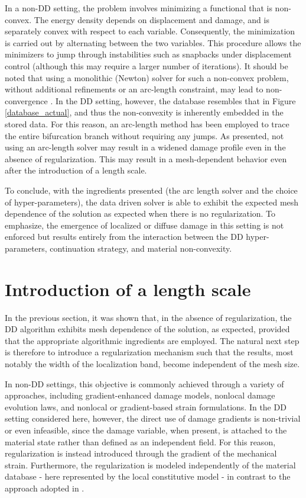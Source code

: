 \documentclass[10pt]{cas-sc}
\begin{document}
In a non-DD setting, the problem involves minimizing a functional that is non-convex. The energy density depends on displacement and damage, and is separately convex with respect to each variable. Consequently, the minimization is carried out by alternating between the two variables. This procedure allows the minimizers to jump through instabilities such as snapbacks under displacement control (although this may require a larger number of iterations). It should be noted that using a monolithic (Newton) solver for such a non-convex problem, without additional refinements or an arc-length constraint, may lead to non-convergence \cite{Farrell2017, Gerasimov2016, Singh2016, Bharali2022}. In the DD setting, however, the database resembles that in Figure \ref{database_actual}, and thus the non-convexity is inherently embedded in the stored data. For this reason, an arc-length method has been employed to trace the entire bifurcation branch without requiring any jumps. As presented, not using an arc-length solver may result in a widened damage profile even in the absence of regularization. This may result in a mesh-dependent behavior even after the introduction of a length scale.

To conclude, with the ingredients presented (the arc length solver and the choice of hyper-parameters), the data driven solver is able to exhibit the expected mesh dependence of the solution as expected when there is no regularization. To emphasize, the emergence of localized or diffuse damage in this setting is not enforced but results entirely from the interaction between the DD hyper-parameters, continuation strategy, and material non-convexity. 


\section{Introduction of a length scale}

In the previous section, it was shown that, in the absence of regularization, the DD algorithm exhibits mesh dependence of the solution, as expected, provided that the appropriate algorithmic ingredients are employed. The natural next step is therefore to introduce a regularization mechanism such that the results, most notably the width of the localization band, become independent of the mesh size.

In non-DD settings, this objective is commonly achieved through a variety of approaches, including gradient-enhanced damage models, nonlocal damage evolution laws, and nonlocal or gradient-based strain formulations. In the DD setting considered here, however, the direct use of damage gradients is non-trivial or even infeasible, since the damage variable, when present, is attached to the material state rather than defined as an independent field. For this reason, regularization is instead introduced through the gradient of the mechanical strain. Furthermore, the regularization is modeled independently of the material database - here represented by the local constitutive model - in contrast to the approach adopted in \cite{Ulloa2024}.
\end{document}
